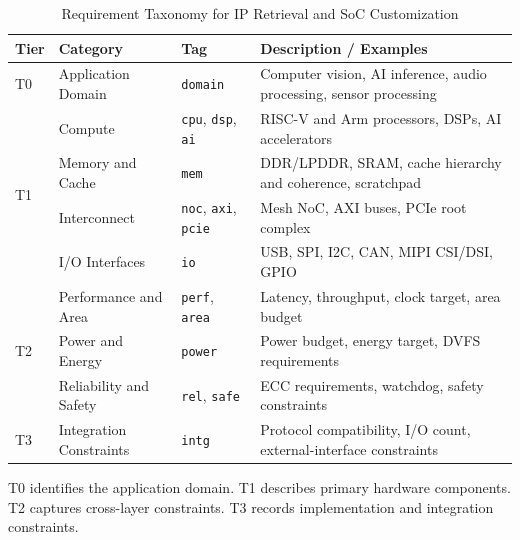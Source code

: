 \begin{table}[htb]
\centering
\begin{threeparttable}
  \caption{Requirement Taxonomy for IP Retrieval and SoC Customization}
  \label{tab:req_taxonomy}
  \footnotesize
\begin{tabularx}{0.9\linewidth}{
  p{0.55cm}
  p{2.8cm}
  p{2.1cm}
  X}
    \toprule
    \textbf{Tier\tnote{a}} &
    \textbf{Category} &
    \textbf{Tag} &
    \textbf{Description / Examples} \\
    \midrule

    \multirow{1}{*}{T0}
      & Application Domain
      & \texttt{domain}
      & Computer vision, AI inference, audio processing, sensor processing \\

    \midrule
    \multirow{4}{*}{T1}
      & Compute
      & \texttt{cpu}, \texttt{dsp}, \texttt{ai}
      & RISC-V and Arm processors, DSPs, AI accelerators \\

      & Memory and Cache
      & \texttt{mem}
      & DDR/LPDDR, SRAM, cache hierarchy and coherence, scratchpad \\

      & Interconnect
      & \texttt{noc}, \texttt{axi}, \texttt{pcie}
      & Mesh NoC, AXI buses, PCIe root complex \\

      & I/O Interfaces
      & \texttt{io}
      & USB, SPI, I2C, CAN, MIPI CSI/DSI, GPIO \\

    \midrule
    \multirow{3}{*}{T2}
      & Performance and Area
      & \texttt{perf}, \texttt{area}
      & Latency, throughput, clock target, area budget \\

      & Power and Energy
      & \texttt{power}
      & Power budget, energy target, DVFS requirements \\

      & Reliability and Safety
      & \texttt{rel}, \texttt{safe}
      & ECC requirements, watchdog, safety constraints \\

    \midrule
    \multirow{1}{*}{T3}
      & Integration Constraints
      & \texttt{intg}
      & Protocol compatibility, I/O count, external-interface constraints \\

    \bottomrule
  \end{tabularx}
  \begin{tablenotes}
    \footnotesize
    \item[a] T0 identifies the application domain. T1 describes primary hardware components. T2 captures cross-layer constraints. T3 records implementation and integration constraints.
  \end{tablenotes}

\end{threeparttable}
\end{table}

